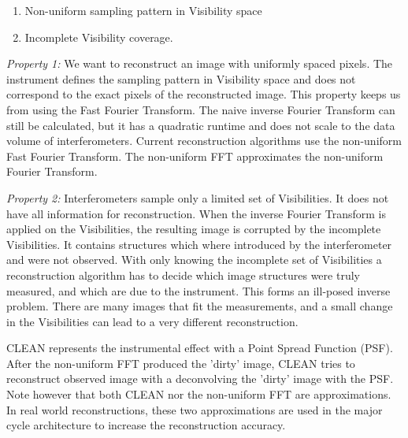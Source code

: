 \begin{enumerate}
	\item Non-uniform sampling pattern in Visibility space
	\item Incomplete Visibility coverage. 
\end{enumerate} 

\textit{Property 1:} We want to reconstruct an image with uniformly spaced pixels. The instrument defines the sampling pattern in Visibility space and does not correspond to the exact pixels of the reconstructed image. This property keeps us from using the Fast Fourier Transform. The naive inverse Fourier Transform can still be calculated, but it has a quadratic runtime and does not scale to the data volume of interferometers. Current reconstruction algorithms use the non-uniform Fast Fourier Transform. The non-uniform FFT approximates the non-uniform Fourier Transform. 

\textit{Property 2:} Interferometers sample only a limited set of Visibilities. It does not have all information for reconstruction. When the inverse Fourier Transform is applied on the Visibilities, the resulting image is corrupted by the incomplete Visibilities. It contains structures which where introduced by the interferometer and were not observed. With only knowing the incomplete set of Visibilities a reconstruction algorithm has to decide which image structures were truly measured, and which are due to the instrument. This forms an ill-posed inverse problem. There are many images that fit the measurements, and a small change in the Visibilities can lead to a very different reconstruction. 

CLEAN represents the instrumental effect with a Point Spread Function (PSF). After the non-uniform FFT produced the 'dirty' image, CLEAN tries to reconstruct observed image with a deconvolving the 'dirty' image with the PSF. Note however that both CLEAN nor the non-uniform FFT are approximations. In real world reconstructions, these two approximations are used in the major cycle architecture to increase the reconstruction accuracy. 



